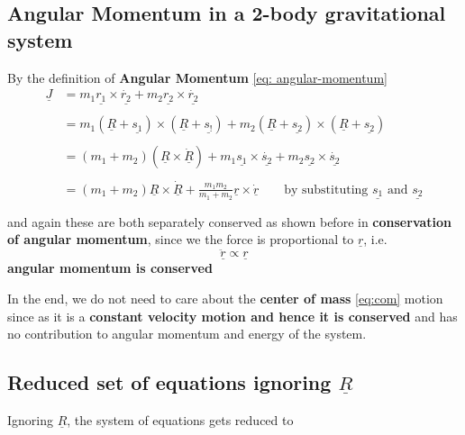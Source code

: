 \subsection{Angular Momentum in a 2-body gravitational system}
By the definition of {\bf Angular Momentum} \eqref{eq: angular-momentum}
\begin{align*}
	\underline{J} & = m_{1}\underline{r_{1}} \times \underline{\dot{r_{2}}} + m_{2}\underline{r_{2}} \times \underline{\dot{r_{2}}}                                                             \\ \\
	              & = m_{1}(\underline{R} + \underline{s_{1}}) \times (\underline{R} + \underline{s_{!}}) + m_{2}(\underline{R} + \underline{s_{2}}) \times (\underline{R} + \underline{s_{2}}) \\ \\
	              & = (m_{1} + m_{2})(\underline{R} \times \underline{\dot{R}}) + m_{1}\underline{s_{1}} \times \underline{\dot{s_{2}}} + m_{2}\underline{s_{2}} \times \underline{\dot{s_{2}}} \\ \\
	              & = (m_{1} + m_{2})\underline{R} \times \underline{\dot{R}} + \frac{m_{1}m_{2}}{m_{1} +m_{2}}\underline{r} \times \underline{\dot{r}} \ \ \ \ \ \ \ \ \ \text{by
		substituting } \underline{s_{1}} \text{ and
	} \underline{s_{2}}                                                                                                                                                                         \\ \\
\end{align*}
and again these are both separately conserved as shown before in {\bf
		conservation of angular momentum},
since we the force is proportional to $\underline{r}$, i.e.
$$\underline{\ddot{r}} \propto \underline{r}$$
{\bf angular momentum is conserved}

\begin{remark}
	In the end, we do not need to care about the {\bf center of mass}
	\eqref{eq:com} motion since as it is a {\bf constant velocity motion and hence
			it is conserved} and has no contribution to angular momentum and energy of the system.
\end{remark}

\subsection{Reduced set of equations ignoring $\underline{R}$}
Ignoring $\underline{R}$, the system of equations gets reduced to

